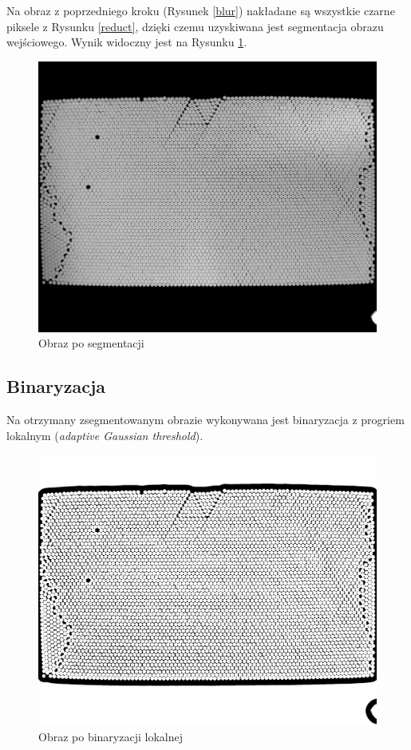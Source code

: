 \documentclass[12pt]{article}
\begin{document}
Na obraz z poprzedniego kroku (Rysunek \ref{blur}) nakładane są wszystkie czarne piksele z Rysunku \ref{reduct}, dzięki czemu uzyskiwana jest segmentacja obrazu wejściowego. Wynik widoczny jest na Rysunku \ref{segmented}.

\begin{figure}[H]
\centering \includegraphics[scale=0.108]{step3.png}
\caption{Obraz po segmentacji}
\label{segmented}
\end{figure}

\subsection{Binaryzacja}
Na otrzymany zsegmentowanym obrazie wykonywana jest binaryzacja z progriem lokalnym (\textit{adaptive Gaussian threshold}).

\begin{figure}[H]
\centering \includegraphics[scale=0.108]{step4.png}
\caption{Obraz po binaryzacji lokalnej}
\label{binary}
\end{figure}
\end{document}
